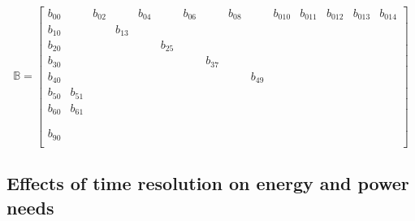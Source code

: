 \documentclass[11pt]{article}
\begin{document}
        \begin{equation}
          \mathbb{B} = \begin{bmatrix}
  b_{00} &        & b_{02} &        & b_{04} &        & b_{06} &        & b_{08} &        & b_{010}& b_{011}& b_{012}& b_{013}& b_{014}\\
  b_{10} &        &        & b_{13} &        &        &        &        &        &        &        &        &        &        &       \\
  b_{20} &        &        &        &        & b_{25} &        &        &        &        &        &        &        &        &       \\
  b_{30} &        &        &        &        &        &        & b_{37} &        &        &        &        &        &        &       \\
  b_{40} &        &        &        &        &        &        &        &        & b_{49} &        &        &        &        &       \\
  b_{50} & b_{51} &        &        &        &        &        &        &        &        &        &        &        &        &       \\
  b_{60} & b_{61} &        &        &        &        &        &        &        &        &        &        &        &        &       \\
         &        &        &        &        &        &        &        &        &        &        &        &        &        &       \\
         &        &        &        &        &        &        &        &        &        &        &        &        &        &       \\
  b_{90} &        &        &        &        &        &        &        &        &        &        &        &        &        &       \\
\end{bmatrix}
        \end{equation}



    \subsection{Effects of time resolution on energy and power needs} %
    \label{sub:effects_of_time_resolution_on_energy_and_power_needs}
    
\end{document}

